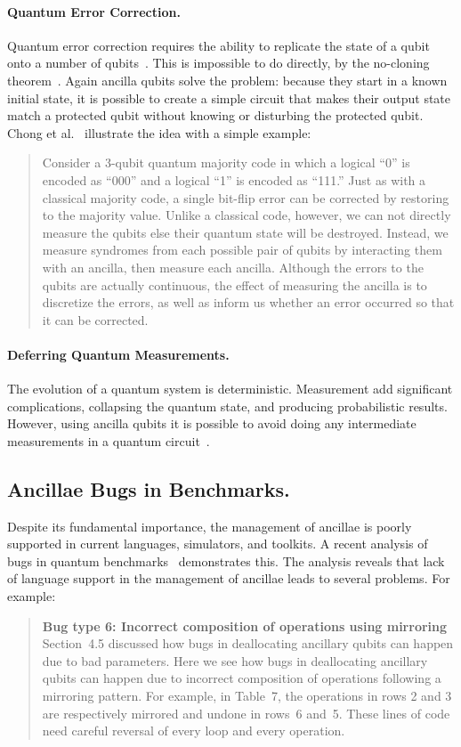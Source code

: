 \documentclass[sigplan,10pt,review,anonymous]{acmart}
\begin{document}
\paragraph*{Quantum Error Correction.}
Quantum error correction requires the ability to replicate the state of a
qubit onto a number of qubits~\cite[Ch.~3]{NAP25196}. This is impossible to do
directly, by the no-cloning
theorem~\cite{park1970concept,wootters1982single,dieks1982communication}. Again
ancilla qubits solve the problem: because they start in a known
initial state, it is possible to create a simple circuit that makes
their output state match a protected qubit without knowing or
disturbing the protected qubit. Chong et al.~\cite{sigarchblog}
illustrate the idea with a simple example:
\begin{quote}
Consider a 3-qubit quantum majority code in which a logical ``0'' is
encoded as ``000'' and a logical ``1'' is encoded as ``111.''  Just as with
a classical majority code, a single bit-flip error can be corrected by
restoring to the majority value.  Unlike a classical code, however, we
can not directly measure the qubits else their quantum state will be
destroyed.  Instead, we measure syndromes from each possible pair of
qubits by interacting them with an ancilla, then measure each ancilla.
Although the errors to the qubits are actually continuous, the effect
of measuring the ancilla is to discretize the errors, as well as
inform us whether an error occurred so that it can be corrected.
\end{quote}

\paragraph*{Deferring Quantum Measurements.} The evolution of a
quantum system is deterministic. Measurement add significant
complications, collapsing the quantum state, and producing
probabilistic results. However, using ancilla qubits it is possible to
avoid doing any intermediate measurements in a quantum
circuit~\cite{dewolf}.

\subsection{Ancillae Bugs in Benchmarks.}
Despite its fundamental importance, the management of ancillae is
poorly supported in current languages, simulators, and toolkits.
A recent analysis of bugs in quantum
benchmarks~\cite{DBLP:conf/oopsla/HuangM18} demonstrates this. The analysis
reveals that lack of language support in the management of ancillae leads to
several problems. For example:
\begin{quote}
  \textbf{Bug type 6: Incorrect composition of operations using mirroring}
  Section~4.5 discussed how bugs in deallocating ancillary qubits can
  happen due to bad parameters. Here we see how bugs in deallocating
  ancillary qubits can happen due to incorrect composition of
  operations following a mirroring pattern. For example, in Table~7,
  the operations in rows 2 and 3 are respectively mirrored and undone
  in rows~6 and~5. These lines of code need careful reversal of every
  loop and every operation.
\end{quote}
\end{document}
